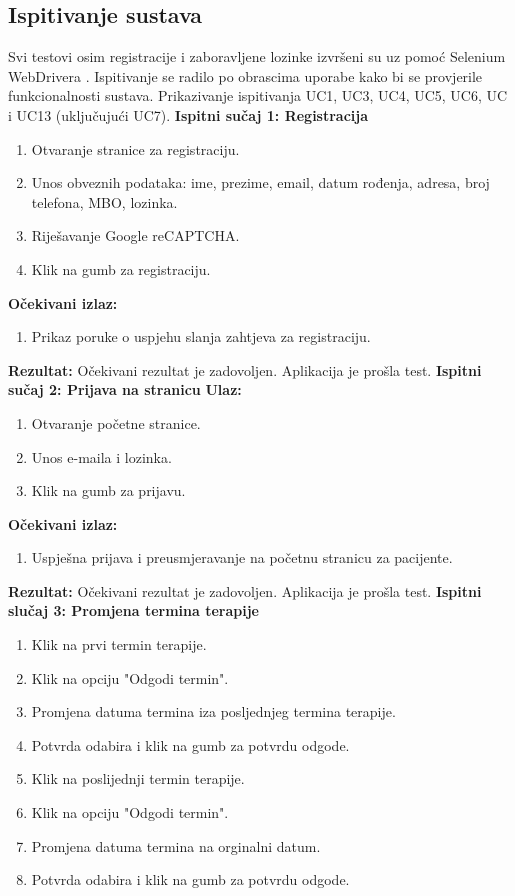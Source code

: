 			\subsection{Ispitivanje sustava}
			Svi testovi osim registracije i zaboravljene lozinke izvršeni su uz pomoć Selenium WebDrivera . Ispitivanje se radilo po obrascima uporabe kako bi
se provjerile funkcionalnosti sustava. Prikazivanje ispitivanja UC1, UC3, UC4, UC5, UC6, UC i UC13 (uključujući UC7).
			\newline
			\textbf{Ispitni sučaj 1: Registracija} 
			\begin{enumerate}
				\item Otvaranje stranice za registraciju.
				\item Unos obveznih podataka: ime, prezime, email, datum rođenja, adresa, broj telefona, MBO, lozinka.
				\item Riješavanje Google reCAPTCHA.
				\item Klik na gumb za registraciju.
			\end{enumerate}
			\textbf{Očekivani izlaz:}
			\begin{enumerate}
				\item Prikaz poruke o uspjehu slanja zahtjeva za registraciju.
			\end{enumerate}
			\textbf{Rezultat:} Očekivani rezultat je zadovoljen. \color{green} Aplikacija je prošla test. \color{black} \newline
			\textbf{Ispitni sučaj 2: Prijava na stranicu} 
			\textbf{Ulaz:}
			\begin{enumerate}
				\item Otvaranje početne stranice.
				\item Unos e-maila i lozinka.
				\item Klik na gumb za prijavu.
			\end{enumerate}
			\textbf{Očekivani izlaz:}
			\begin{enumerate}
				\item Uspješna prijava i preusmjeravanje na početnu stranicu za pacijente.
			\end{enumerate}
			\textbf{Rezultat:} Očekivani rezultat je zadovoljen. \color{green} Aplikacija je prošla test. \color{black} \newline
			\textbf{Ispitni slučaj 3: Promjena termina terapije}
			\begin{enumerate}
				\item Klik na prvi termin terapije.
				\item Klik na opciju "Odgodi termin".
				\item Promjena datuma termina iza posljednjeg termina terapije.
				\item Potvrda odabira i klik na gumb za potvrdu odgode.
				\item Klik na poslijednji termin terapije.
				\item Klik na opciju "Odgodi termin".
				\item Promjena datuma termina na orginalni datum.
				\item Potvrda odabira i klik na gumb za potvrdu odgode.
			\end{enumerate}
